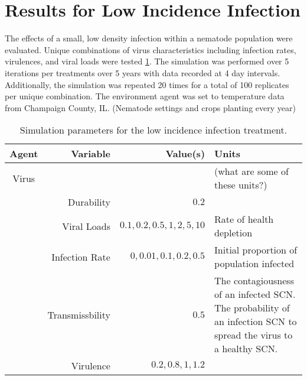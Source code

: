 




%

\section{Results for Low Incidence Infection}

The effects of a small, low density infection within a nematode population were evaluated. Unique combinations of virus characteristics including infection rates, virulences, and viral loads were tested \ref{tbl:lowiiprops}.  The simulation was performed over 5 iterations per treatments over 5 years with data recorded at 4 day intervals.  Additionally, the simulation was repeated 20 times for a total of 100 replicates per unique combination.  The environment agent was set to temperature data from Champaign County, IL.    (Nematode settings and crops planting every year)  

\begin{table}[htpb]
\caption[Low Incidence Infection Parameters]{Simulation parameters for the low incidence infection treatment.}
\centering
\label{tbl:lowiiprops}
\begin{tabular}{|c r r p{3in}|}
	\hline
		Agent & Variable & Value(s) & Units \\
	\hline
		Virus &          &          &  (what are some of these units?)     \\
		      & Durability & $0.2$ &\\
		      & Viral Loads & $0.1, 0.2, 0.5, 1, 2, 5, 10$ & Rate of health depletion\\
		      & Infection Rate & $0, 0.01, 0.1, 0.2, 0.5$ & Initial proportion of population infected \\
		      & Transmissbility & $0.5$    &  The contagiousness of an infected SCN.  The probability of an infection SCN to spread the virus to a healthy SCN. \\ 
		      & Virulence & $ 0.2,0.8, 1, 1.2$    &    \\
	\hline
\end{tabular}
\end{table}

